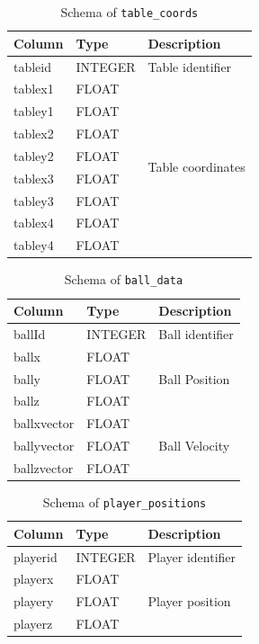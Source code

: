 \documentclass[conference]{IEEEtran}
\begin{document}
\begin{table}[ht]
    \centering
    \caption{Schema of \texttt{table\_coords}}
    \label{tab:tablecoords}
    \begin{tabular}{|l|l|l|}
        \hline
        \textbf{Column} & \textbf{Type} & \textbf{Description} \\
        \hline
        tableid   & INTEGER & Table identifier \\
        tablex1   & FLOAT   & \multirow{8}{*}{Table coordinates} \\
        tabley1   & FLOAT   &  \\
        tablex2   & FLOAT   &  \\
        tabley2   & FLOAT   &  \\
        tablex3   & FLOAT   &  \\
        tabley3   & FLOAT   &  \\
        tablex4   & FLOAT   &  \\
        tabley4   & FLOAT   &  \\
        \hline
    \end{tabular}
\end{table}

\begin{table}[ht]
    \centering
    \caption{Schema of \texttt{ball\_data}}
    \label{tab:balldata}
    \begin{tabular}{|l|l|l|}
        \hline
        \textbf{Column} & \textbf{Type} & \textbf{Description} \\
        \hline
        ballId          & INTEGER       & Ball identifier \\
        ballx           & FLOAT         &  \\
        bally           & FLOAT         & Ball Position \\
        ballz           & FLOAT         &  \\
        ballxvector     & FLOAT         &  \\
        ballyvector     & FLOAT         & Ball Velocity \\
        ballzvector     & FLOAT         &  \\
        \hline
    \end{tabular}
\end{table}

\begin{table}[ht]
    \centering
    \caption{Schema of \texttt{player\_positions}}
    \label{tab:playerpositions}
    \begin{tabular}{|l|l|l|}
        \hline
        \textbf{Column} & \textbf{Type} & \textbf{Description} \\
        \hline
        playerid        & INTEGER       & Player identifier \\
        playerx         & FLOAT         & \\
        playery         & FLOAT         & Player position \\
        playerz         & FLOAT         & \\
        \hline
    \end{tabular}
\end{table}
\end{document}

